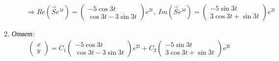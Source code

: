 \documentclass[10pt, a4paper]{article}
\begin{document}
\begin{enumerate}
\begin{enumerate}
                \begin{gather*}
                    \Rightarrow
                    Re(\Vec{S} e^{\lambda t}) =
                    \begin{pmatrix}
                        -5\cos{3t} \\
                        \cos{3t} - 3\sin{3t}
                    \end{pmatrix} e^{2t}, \;
                    Im(\Vec{S} e^{\lambda t}) =
                    \begin{pmatrix}
                        -5\sin{3t} \\
                        3\cos{3t} + \sin{3t}
                    \end{pmatrix} e^{2t}
                \end{gather*}
        \end{enumerate}
    \item
        \textit{Ответ:}
        \begin{gather*}
            \begin{pmatrix} x \\ y \end{pmatrix} =
            C_1\begin{pmatrix} -5\cos{3t} \\ \cos{3t} - 3\sin{3t} \end{pmatrix} e^{2t}
            + C_2 \begin{pmatrix} -5\sin{3t} \\ 3\cos{3t} + \sin{3t} \end{pmatrix} e^{2t}
        \end{gather*}
\end{enumerate}
\end{document}
